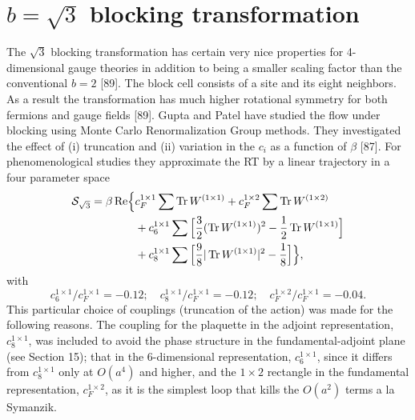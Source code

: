 \section{$b=\sqrt{3}$ blocking transformation}

The $\sqrt{3}$ blocking transformation has certain very nice properties
for 4-dimensional gauge theories in addition to being a smaller scaling
factor than the conventional $b = 2$ [89].  The block cell consists of a
site and its eight neighbors.  As a result the transformation has much
higher rotational symmetry for both fermions and gauge fields [89].
Gupta and Patel have studied the flow under blocking using Monte Carlo
Renormalization Group methods.  They investigated the effect of (i)
truncation and (ii) variation in the $c_i$ as a function of $\beta$
[87].  For phenomenological studies they approximate the RT by a linear
trajectory in a four parameter space
\begin{equation}
\begin{aligned}
\mathcal{S}_{\sqrt{3}} = \beta\,\mathrm{Re}\Big\{&
    c_F^{1\times1}\sum\Tr W^{(1\times1)}
    + c_F^{1\times2}\sum\Tr W^{(1\times2)}\\
    &+ c_6^{1\times1}\sum\Big[\frac{3}{2}(\Tr W^{(1\times1)})^2
        - \frac{1}{2}\Tr W^{(1\times1)}\Big]\\
    &+ c_8^{1\times1}\sum\Big[\frac{9}{8}|\Tr W^{(1\times1)}|^2
        - \frac{1}{8}\Big]\Big\},
\end{aligned}
\label{eq:rootthreedef}
\end{equation}
with
\begin{equation}
c_6^{1\times1}/c_F^{1\times1} = -0.12;\quad
c_8^{1\times1}/c_F^{1\times1} = -0.12;\quad
c_F^{1\times2}/c_F^{1\times1} = -0.04.
\label{eq:rootthreerat}
\end{equation}
This particular choice of couplings (truncation of the action) was made
for the following reasons.  The coupling for the plaquette in the
adjoint representation, $c_8^{1\times1}$, was included to avoid the
phase structure in the fundamental-adjoint plane (see Section 15); that
in the 6-dimensional representation, $c_6^{1\times1}$, since it differs
from $c_8^{1\times1}$ only at $O(a^4)$ and higher, and the $1\times2$
rectangle in the fundamental representation, $c_F^{1\times2}$, as it is
the simplest loop that kills the $O(a^2)$ terms a la Symanzik.

